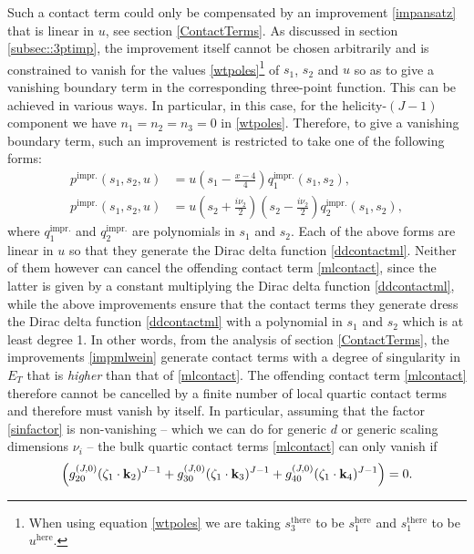 \documentclass[11pt,a4paper]{article}
\begin{document}
Such a contact term could only be compensated by an improvement \eqref{impansatz} that is linear in $u$, see section \ref{ContactTerms}. As discussed in section \ref{subsec::3ptimp}, the improvement itself cannot be chosen arbitrarily and is constrained to vanish for the values \eqref{wtpoles}\footnote{When using equation \eqref{wtpoles} we are taking $s^{\text{there}}_3$ to be $s^{\text{here}}_1$ and $s^{\text{there}}_1$ to be $u^{\text{here}}$.} of $s_{1}$, $s_{2}$ and $u$ so as to give a vanishing boundary term in the corresponding three-point function. This can be achieved in various ways. In particular, in this case, for the helicity-$\left(J-1\right)$ component we have $n_1=n_2=n_3=0$ in \eqref{wtpoles}. Therefore, to give a vanishing boundary term, such an improvement is restricted to take one of the following forms: 
\begin{subequations}\label{impmlwein}
\begin{align}
    p^{\text{impr.}}\left(s_1,s_2,u\right) &= u\left(s_1-\tfrac{x-4}{4}\right)q^{\text{impr.}}_1\left(s_1,s_2\right),\\
    p^{\text{impr.}}\left(s_1,s_2,u\right) &= u \left(s_2+ \tfrac{i\nu_2}{2}\right)\left(s_2- \tfrac{i\nu_2}{2}\right)q^{\text{impr.}}_2\left(s_1,s_2\right),
\end{align}
\end{subequations}
where $q^{\text{impr.}}_1$ and $q^{\text{impr.}}_2$ are polynomials in $s_1$ and $s_2$. Each of the above forms are linear in $u$ so that they generate the Dirac delta function \eqref{ddcontactml}. Neither of them however can cancel the offending contact term \eqref{mlcontact}, since the latter is given by a constant multiplying the Dirac delta function \eqref{ddcontactml}, while the above improvements ensure that the contact terms they generate dress the Dirac delta function \eqref{ddcontactml} with a polynomial in $s_1$ and $s_2$ which is at least degree 1. In other words, from the analysis of section \ref{ContactTerms}, the improvements \eqref{impmlwein} generate contact terms with a degree of singularity in $E_T$ that is \emph{higher} than that of \eqref{mlcontact}. 
The offending contact term \eqref{mlcontact} therefore cannot be cancelled by a finite number of local quartic contact terms and therefore must vanish by itself. In particular, assuming that the factor \eqref{sinfactor} is non-vanishing -- which we can do for generic $d$ or generic scaling dimensions $\nu_i$ -- the bulk quartic contact terms \eqref{mlcontact} can only vanish if
\begin{equation}\label{wtml}
    \left(g_{20}^{(J,0)}(\zeta_1\cdot\bold{k}_2)^{J-1}+g_{30}^{(J,0)}(\zeta_1\cdot\bold{k}_3)^{J-1}+g_{40}^{(J,0)}(\zeta_1\cdot\bold{k}_4)^{J-1}\right) = 0.
\end{equation}
\end{document}
